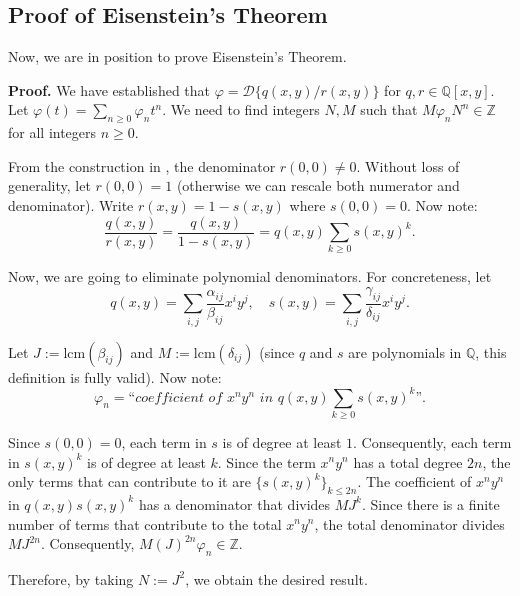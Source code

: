 \documentclass{template}
\begin{document}
\subsection{Proof of Eisenstein's Theorem}

Now, we are in position to prove Eisenstein's Theorem.

\textbf{Proof.} We have established that $\varphi = \mathcal{D}\{q(x,y)/r(x,y)\}$ for $q,r \in \mathbb{Q}[x,y]$.
Let $\varphi(t) = \sum_{n \geq 0}\varphi_nt^n$. We need to find integers $N,M$ such that $M\varphi_nN^n \in \mathbb{Z}$ for all integers $n \geq 0$.

From the construction in , the denominator $r(0,0) \neq 0$. Without loss of generality, let $r(0,0)=1$ (otherwise we can rescale both numerator and denominator).
Write $r(x,y) = 1 - s(x,y)$ where $s(0,0)=0$. Now note:
\begin{equation*}
    \frac{q(x,y)}{r(x,y)} = \frac{q(x,y)}{1-s(x,y)} = q(x,y)\sum_{k \geq 0}s(x,y)^k.
\end{equation*} 

Now, we are going to eliminate polynomial denominators. For concreteness, let
\begin{equation*}
    q(x,y) = \sum_{i,j} \frac{\alpha_{ij}}{\beta_{ij}}x^iy^j, \quad s(x,y) = \sum_{i,j} \frac{\gamma_{ij}}{\delta_{ij}}x^iy^j.
\end{equation*} 

Let $J := \text{lcm}(\beta_{ij})$ and $M := \text{lcm}(\delta_{ij})$ (since $q$ and $s$ are polynomials in $\mathbb{Q}$, this definition is fully valid).
Now note:
\begin{equation*}
    \varphi_n = \textit{``coefficient of $x^ny^n$ in $q(x,y)\sum_{k \geq 0}s(x,y)^k$''}.
\end{equation*}

Since $s(0,0)=0$, each term in $s$ is of degree at least $1$.
Consequently, each term in $s(x,y)^k$ is of degree at least $k$.
Since the term $x^ny^n$ has a total degree $2n$, the only terms that can contribute to it are $\{s(x,y)^k\}_{k \leq 2n}$.
The coefficient of $x^ny^n$ in $q(x,y)s(x,y)^k$ has a denominator that divides $MJ^k$.
Since there is a finite number of terms that contribute to the total $x^ny^n$, the total denominator divides $MJ^{2n}$.
Consequently, $M(J)^{2n}\varphi_n \in \mathbb{Z}$.

Therefore, by taking $N := J^2$, we obtain the desired result.



\end{document}
